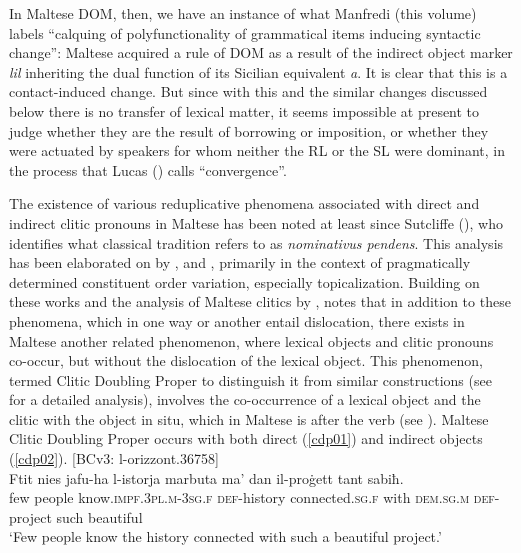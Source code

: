 \documentclass[output=paper]{langsci/langscibook}
\begin{document}
In Maltese DOM, then, we have an instance of what Manfredi (this volume) labels ``calquing of polyfunctionality of grammatical items inducing syntactic change'': Maltese acquired a rule of DOM as a result of the indirect object marker \textit{lil} inheriting the dual function of its Sicilian equivalent \textit{a}. It is clear that this is a contact-induced change. But since with this and the similar changes discussed below there is no transfer of lexical matter, it seems impossible at present to judge whether they are the result of borrowing or imposition, or whether they were actuated by speakers for whom neither the RL or the SL were dominant, in the process that Lucas (\citeyear{Lucas2015}) calls ``convergence''. 

The existence of various reduplicative phenomena associated with direct and indirect clitic pronouns in Maltese has been noted at least since Sutcliffe (\citeyear[179]{sutcliffe}), who identifies what classical tradition refers to as \textit{nominativus pendens}. This analysis has been elaborated on by \cite{fabri1993}, \cite{BorgAzzopardi-Alexander1997} and \cite{fabriborgtopicfocus}, primarily in the context of pragmatically determined constituent order variation, especially topicalization. Building on these works and the analysis of Maltese clitics by \cite{camilleri2011}, \cite{bulbul2014} notes that in addition to these phenomena, which in one way or another entail dislocation, there exists in Maltese another related phenomenon, where lexical objects and clitic pronouns co-occur, but without the dislocation of the lexical object. This phenomenon, termed Clitic Doubling Proper to distinguish it from similar constructions (see \citealt{krapovacinque2008} for a detailed analysis), involves the co-occurrence of a lexical object and the clitic with the object in situ, which in Maltese is after the verb (see \citealt{bulbul2018}). Maltese Clitic Doubling Proper occurs with both direct (\ref{cdp01}) and indirect objects (\ref{cdp02}).
\ea\label{cdp01} 
{[BCv3: l-orizzont.36758]}\\
\gll Ftit nies jafu-ha l-istorja marbuta ma' dan il-proġett tant sabiħ.\\
	few people know.\textsc{impf.3pl.m}-\textsc{3sg.f} \textsc{def}-history connected.\textsc{sg.f} with \textsc{dem.sg.m} \textsc{def}-project such beautiful\\
	\glt `Few people know the history connected with such a beautiful project.'\\
\end{document}
